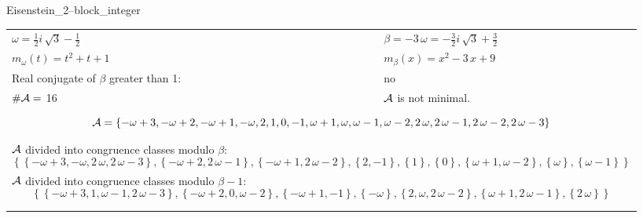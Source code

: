 \begin{exmp}
\label{ex:compareAD}

Eisenstein\_2--block\_integer

\rule{0cm}{0cm}

\begin{tabular}{ll}
$\omega=  \frac{1}{2} i \, \sqrt{3} - \frac{1}{2} $  & $\beta= -3 \, \omega = -\frac{3}{2} i \, \sqrt{3} + \frac{3}{2} $\\
$m_\omega(t)=  t^{2} + t + 1 $  & $m_\beta(x)=  x^{2} - 3 \, x + 9 $\\
Real conjugate of $\beta$ greater than 1:   &  no \\
$\#\mathcal{A}= $ 16 $ $ & $\mathcal{A}$ is not minimal. \\
\multicolumn{2}{l}{\begin{minipage}{\textwidth}\begin{dmath*}\A = \left\{-\omega + 3, -\omega + 2, -\omega + 1, -\omega, 2, 1, 0, -1, \omega + 1, \omega, \omega - 1, \omega - 2, 2 \, \omega, 2 \, \omega - 1, 2 \, \omega - 2, 2 \, \omega - 3\right\}  \end{dmath*}\end{minipage} }\\
\multicolumn{2}{l}{\begin{minipage}{\textwidth}$\mathcal{A}$ divided into congruence classes modulo $\beta$: \begin{dmath*} \left\{\left\{-\omega + 3, -\omega, 2 \, \omega, 2 \, \omega - 3\right\}, \left\{-\omega + 2, 2 \, \omega - 1\right\}, \left\{-\omega + 1, 2 \, \omega - 2\right\}, \left\{2, -1\right\}, \left\{1\right\}, \left\{0\right\}, \left\{\omega + 1, \omega - 2\right\}, \left\{\omega\right\}, \left\{\omega - 1\right\}\right\}  \end{dmath*}\end{minipage} }\\[10pt]
\multicolumn{2}{l}{\begin{minipage}{\textwidth}$\mathcal{A}$ divided into congruence classes modulo $\beta-1$: \begin{dmath*} \left\{\left\{-\omega + 3, 1, \omega - 1, 2 \, \omega - 3\right\}, \left\{-\omega + 2, 0, \omega - 2\right\}, \left\{-\omega + 1, -1\right\}, \left\{-\omega\right\}, \left\{2, \omega, 2 \, \omega - 2\right\}, \left\{\omega + 1, 2 \, \omega - 1\right\}, \left\{2 \, \omega\right\}\right\}  \end{dmath*}\end{minipage} }\\
 & \\ \hline
 & \\
\end{tabular}


\end{exmp}
